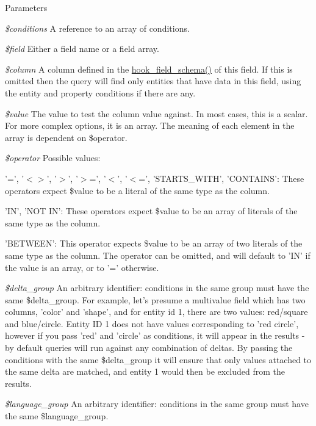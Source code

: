\begin{DoxyParams}{Parameters}
\item[{\em \$conditions}]A reference to an array of conditions. \item[{\em \$field}]Either a field name or a field array. \item[{\em \$column}]A column defined in the \hyperlink{group__field__types_gaae7d9348e56f207a8be0b866d25252b7}{hook\_\-field\_\-schema()} of this field. If this is omitted then the query will find only entities that have data in this field, using the entity and property conditions if there are any. \item[{\em \$value}]The value to test the column value against. In most cases, this is a scalar. For more complex options, it is an array. The meaning of each element in the array is dependent on \$operator. \item[{\em \$operator}]Possible values:
\begin{DoxyItemize}
\item '=', '$<$$>$', '$>$', '$>$=', '$<$', '$<$=', 'STARTS\_\-WITH', 'CONTAINS': These operators expect \$value to be a literal of the same type as the column.
\item 'IN', 'NOT IN': These operators expect \$value to be an array of literals of the same type as the column.
\item 'BETWEEN': This operator expects \$value to be an array of two literals of the same type as the column. The operator can be omitted, and will default to 'IN' if the value is an array, or to '=' otherwise. 
\end{DoxyItemize}\item[{\em \$delta\_\-group}]An arbitrary identifier: conditions in the same group must have the same \$delta\_\-group. For example, let's presume a multivalue field which has two columns, 'color' and 'shape', and for entity id 1, there are two values: red/square and blue/circle. Entity ID 1 does not have values corresponding to 'red circle', however if you pass 'red' and 'circle' as conditions, it will appear in the results -\/ by default queries will run against any combination of deltas. By passing the conditions with the same \$delta\_\-group it will ensure that only values attached to the same delta are matched, and entity 1 would then be excluded from the results. \item[{\em \$language\_\-group}]An arbitrary identifier: conditions in the same group must have the same \$language\_\-group.\end{DoxyParams}
